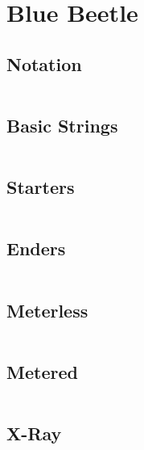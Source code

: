 \documentclass[main.tex]{subfiles}
\begin{document}
\chapter{Blue Beetle}

\section{Notation}
\begin{lstlisting}[language=FG]
\end{lstlisting}


\section{Basic Strings}

\begin{lstlisting}[language=FG]
\end{lstlisting}

\section{Starters}
\begin{lstlisting}[language=FG]

\end{lstlisting}

\section{Enders}

\begin{lstlisting}[language=FG]
\end{lstlisting}

\section{Meterless}


\begin{lstlisting}[language=FG]

\end{lstlisting}

\section{Metered}


\begin{lstlisting}[language=FG]
\end{lstlisting}

\section{X-Ray}
\begin{lstlisting}[language=FG]

\end{lstlisting}
\end{document}
